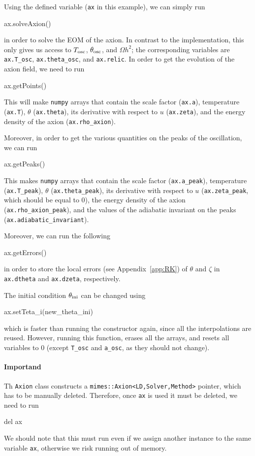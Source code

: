 \documentclass[11pt,a4paper]{article}
\begin{document}
Using the defined variable ({\tt ax} in this example), we can simply run  
%
\begin{py}
	ax.solveAxion()
\end{py}
%
in order to solve the EOM of the axion. In contrast to the \CPP implementation, this only gives us access to $T_{\rm osc}{}$, $\theta_{\rm osc}{}$, and $\Omega h^2$; the corresponding variables are {\tt ax.T\_osc}, {\tt ax.theta\_osc}, and {\tt ax.relic}. In order to get the evolution of the axion field, we need to run 
%
\begin{py}
	ax.getPoints()
\end{py}
%
This will make {\tt numpy} arrays that contain the scale factor ({\tt ax.a}), temperature ({\tt ax.T}), $\theta$ ({\tt ax.theta}), its derivative with respect to $u$ ({\tt ax.zeta}), and the energy density of the axion ({\tt ax.rho\_axion}).

Moreover, in order to get the various quantities on the peaks of the oscillation, we can run
%
\begin{py}
	ax.getPeaks()
\end{py}
%
This makes {\tt numpy} arrays that contain the scale factor ({\tt ax.a\_peak}), temperature ({\tt ax.T\_peak}), $\theta$ ({\tt ax.theta\_peak}), its derivative with respect to $u$ ({\tt ax.zeta\_peak}, which should be equal to $0$), the energy density of the axion ({\tt ax.rho\_axion\_peak}), and the values of the adiabatic invariant on the peaks ({\tt ax.adiabatic\_invariant}).

Moreover, we can run the following
%
\begin{py}
	ax.getErrors()
\end{py}
%
in order to store the local errors (see Appendix~\ref{app:RK}) of $\theta$ and $\zeta$ in {\tt ax.dtheta} and {\tt ax.dzeta}, respectively. 


The initial condition $\theta_{\rm ini}{}$ can be changed using 
%
\begin{py}
	ax.setTeta_i(new_theta_ini)
\end{py}
%
which is faster than running the constructor again, since all the interpolations are reused. However, running this function, erases all the arrays, and resets all variables to $0$ (except {\tt T\_osc} and {\tt a\_osc}, as they should not change). 

\paragraph{Importand} Th {\tt Axion} class constructs a {\tt mimes::Axion<LD,Solver,Method>} pointer, which has to be manually deleted. Therefore, once {\tt ax} is used it must be deleted, \ie we need to run 
%
\begin{py}
	del ax
\end{py}
%
We should note that this must run even if we assign another instance to the same variable {\tt ax}, otherwise we risk running out of memory.
\end{document}
